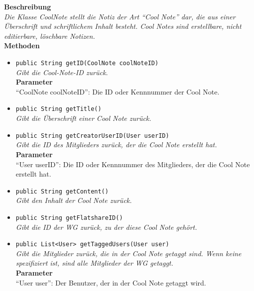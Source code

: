 	\textbf{Beschreibung} \\
	\textit{Die Klasse CoolNote stellt die Notiz der Art “Cool Note” dar, die aus einer Überschrift und schriftlichem Inhalt besteht. Cool Notes sind erstellbare, nicht editierbare, löschbare Notizen.} \\

	\textbf{Methoden}
	\begin{itemize}
		\item\texttt{{public String getID(CoolNote coolNoteID)}}\\
		\textit{Gibt die Cool-Note-ID zurück.}\\
		\textbf{Parameter}\\
		“CoolNote coolNoteID”: Die ID oder Kennnummer der Cool Note.\\
		
		\item\texttt{{public String getTitle()}}\\
		\textit{Gibt die Überschrift einer Cool Note zurück.}\\
		
		\item\texttt{{public String getCreatorUserID(User userID)}}\\
		\textit{Gibt die ID des Mitglieders zurück, der die Cool Note erstellt hat.}\\
		\textbf{Parameter}\\
		“User userID”: Die ID oder Kennnummer des Mitglieders, der die Cool Note erstellt hat.\\
		
		\item\texttt{{public String getContent()}}\\
		\textit{Gibt den Inhalt der Cool Note zurück.}\\
		
		\item\texttt{{public String getFlatshareID()}}\\
		\textit{Gibt die ID der WG zurück, zu der diese Cool Note gehört.}\\
		
		\item\texttt{{public List<User> getTaggedUsers(User user)}}\\
		\textit{Gibt die Mitglieder zurück, die in der Cool Note getaggt sind. Wenn keine spezifiziert ist, sind alle Mitglieder der WG getaggt.}\\
		\textbf{Parameter}\\
		“User user”: Der Benutzer, der in der Cool Note getaggt wird.\\
		

\end{itemize}
